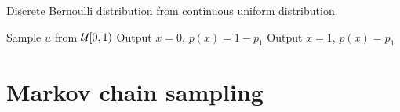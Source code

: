 \begin{algorithm}[H]
\caption[Discrete Bernoulli distribution from continuous uniform distribution]{
Discrete Bernoulli distribution from continuous uniform distribution.
}
\label{alg:bernoulli}
\begin{algorithmic}[1]
\STATE Sample $u$ from $\mathcal{U}[0, 1)$
    \STATE Output $x = 0$, $p(x) = 1 - p_1$
\ELSE
    \STATE Output $x = 1$, $p(x) = p_1$
\ENDIF
\end{algorithmic}
\end{algorithm}

\vfill

\section{Markov chain sampling}

